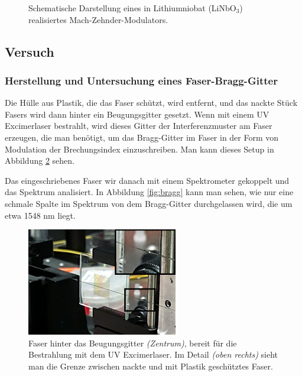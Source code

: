 \documentclass[a4paper]{article}
\begin{document}
\begin{figure}[H]
\begin{tikzpicture}
  \end{tikzpicture}
  \caption{Schematische Darstellung eines in Lithiumniobat (LiNbO$_3$) realisiertes
  Mach-Zehnder-Modulators.}
  \label{fig:mzm}
\end{figure}

\subsection{Versuch}
\subsubsection{Herstellung und Untersuchung eines Faser-Bragg-Gitter}

Die Hülle aus Plastik, die das Faser schützt, wird entfernt, und das nackte
Stück Fasers wird dann hinter ein Beugungsgitter gesetzt. Wenn mit einem UV
Excimerlaser bestrahlt, wird dieses Gitter der Interferenzmuster am Faser
erzeugen, die man benötigt, um das Bragg-Gitter im Faser in der Form von
Modulation der Brechungsindex einzuschreiben. Man kann dieses Setup in
Abbildung \ref{fig:gitt} sehen. 

Das eingeschriebenes Faser wir danach mit einem Spektrometer gekoppelt und
das Spektrum analisiert. In Abbildung \ref{fig:bragg} kann man sehen, wie
nur eine schmale Spalte im Spektrum von dem Bragg-Gitter durchgelassen wird,
die um etwa 1548 nm liegt.

\begin{figure}[H]
  \centering
  \includegraphics{./messungen/gitter.png}
  \caption{Faser hinter das Beugungsgitter \emph{(Zentrum)}, bereit für die
  Bestrahlung mit dem UV Excimerlaser. Im Detail \emph{(oben rechts)} sieht man
die Grenze zwischen nackte und mit Plastik geschütztes Faser.}
  \label{fig:gitt}
\end{figure}
\end{document}
